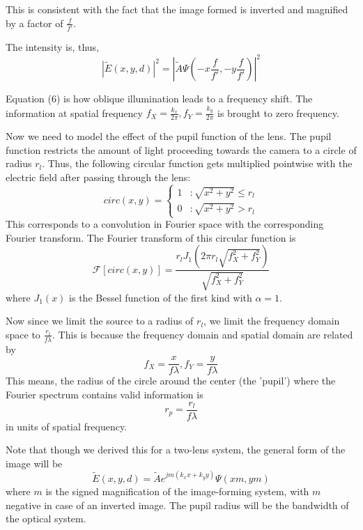 \documentclass[11pt,a4paper,journal]{IEEEtran}
\begin{document}
This is consistent with the fact that the image formed is inverted and magnified by a factor of $\frac{f}{f'}$.

The intensity is, thus,
\begin{equation}
|\tilde{E}(x, y, d)|^2 = \left|\tilde{A} \Psi\left(-x\frac{f}{f'}, -y\frac{f}{f'}\right)\right|^2
\end{equation}

Equation (6) is how oblique illumination leads to a frequency shift. The information at spatial frequency $f_X = \frac{k_x}{2\pi}, f_Y = \frac{k_y}{2\pi}$ is brought to zero frequency.

Now we need to model the effect of the pupil function of the lens. The pupil function restricts the amount of light proceeding towards the camera to a circle of radius $r_{l}$. Thus, the following circular function gets multiplied pointwise with the electric field after passing through the lens:
\begin{equation}
circ(x, y) = \left\{
  \begin{array}{lr}
    1 & : \sqrt{x^2 + y^2} \le r_{l} \\
    0 & : \sqrt{x^2 + y^2} > r_{l}
  \end{array}
\right.
\end{equation}
This corresponds to a convolution in Fourier space with the corresponding Fourier transform. The Fourier transform of this circular function is
\begin{equation}
\mathcal{F}[circ(x, y)] = \frac{r_{l} J_1(2\pi r_l \sqrt{f_X ^2 + f_Y ^2})}{\sqrt{f_X ^2 + f_Y ^2}}
\end{equation}
where $J_1(x)$ is the Bessel function of the first kind with $\alpha=1$.

Now since we limit the source to a radius of $r_l$, we limit the frequency domain space to $\frac{r_l}{f\lambda}$. This is because the frequency domain and spatial domain are related by
\begin{equation*}
f_X=\frac{x}{f\lambda}, f_Y=\frac{y}{f\lambda}
\end{equation*}
This means, the radius of the circle around the center (the 'pupil') where the Fourier spectrum contains valid information is
\begin{equation}
r_p = \frac{r_l}{f\lambda}
\end{equation}
in units of spatial frequency.

Note that though we derived this for a two-lens system, the general form of the image will be
\begin{equation*}
\tilde{E}(x, y, d) = \tilde{A} e^{jm\left(k_x x + k_y y\right)} \Psi\left(xm, ym\right)
\end{equation*}
where $m$ is the signed magnification of the image-forming system, with $m$ negative in case of an inverted image. The pupil radius will be the bandwidth of the optical system.
\end{document}
